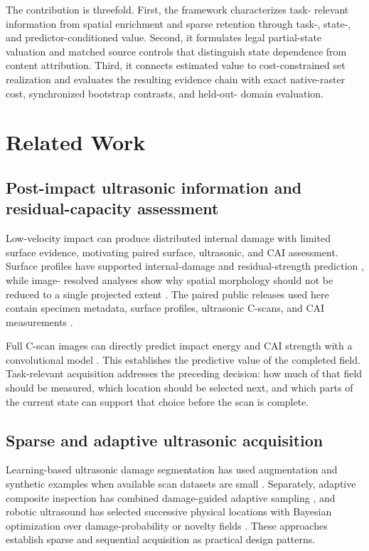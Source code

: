 \documentclass[preprint,12pt]{elsarticle}
\begin{document}
The contribution is threefold. First, the framework characterizes task-
relevant information from spatial enrichment and sparse retention through
task-, state-, and predictor-conditioned value. Second, it formulates legal
partial-state valuation and matched source controls that distinguish state
dependence from content attribution. Third, it connects estimated value to
cost-constrained set realization and evaluates the resulting evidence chain
with exact native-raster cost, synchronized bootstrap contrasts, and held-out-
domain evaluation.

\section{Related Work}
\label{sec:related-work}

\subsection{Post-impact ultrasonic information and residual-capacity assessment}
\label{sec:related-cai}

Low-velocity impact can produce distributed internal damage with limited
surface evidence, motivating paired surface, ultrasonic, and CAI assessment.
Surface profiles have supported internal-damage and residual-strength
prediction \cite{hasebe2022internal,hasebe2025compression}, while image-
resolved analyses show why spatial morphology should not be reduced to a
single projected extent \cite{bull2018image}. The paired public releases used
here contain specimen metadata, surface profiles, ultrasonic C-scans, and CAI
measurements \cite{hasebe2022dataset,hasebe2025caidataset}.

Full C-scan images can directly predict impact energy and CAI strength with a
convolutional model \cite{mack2026cscan}. This establishes the predictive value
of the completed field. Task-relevant acquisition addresses the preceding
decision: how much of that field should be measured, which location should be
selected next, and which parts of the current state can support that choice
before the scan is complete.

\subsection{Sparse and adaptive ultrasonic acquisition}
\label{sec:related-adaptive}

Learning-based ultrasonic damage segmentation has used augmentation and
synthetic examples when available scan datasets are small
\cite{nguyen2025sparse}. Separately, adaptive composite inspection has combined
damage-guided adaptive sampling
\cite{ji2026adaptive}, and robotic ultrasound has selected successive physical
locations with Bayesian optimization over damage-probability or novelty fields
\cite{fuentes2020autonomous}. These approaches establish sparse and sequential
acquisition as practical design patterns.
\end{document}
